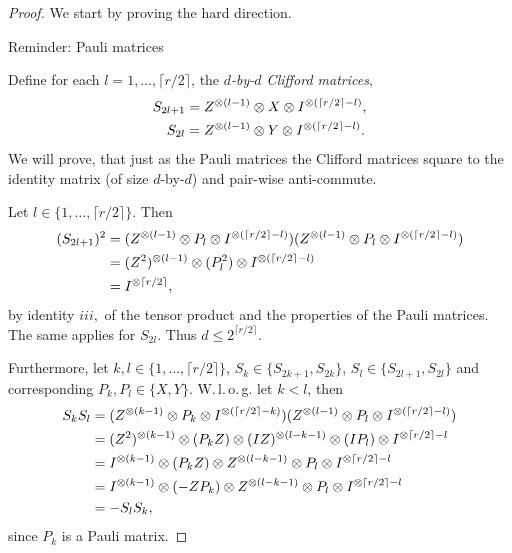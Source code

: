 	\begin{proof}
		We start by proving the hard direction. 
		
		Reminder: Pauli matrices
		
		Define for each $l=1,\dots,\lceil r/2\rceil$, the \emph{$d$-by-$d$ Clifford matrices},
		\begin{align}
			S_{2l+1} &= Z^{\otimes (l-1)} \otimes X \otimes I^{\otimes(\lceil r/2\rceil - l)},\\
			S_{2l} &= Z^{\otimes (l-1)} \otimes Y \otimes I^{\otimes(\lceil r/2\rceil - l)}.
		\end{align}
		We will prove, that just as the Pauli matrices the Clifford matrices square to the identity matrix (of size $d$-by-$d$) and pair-wise anti-commute. 
	
		Let $l\in\{1,\dots,\lceil r/2\rceil\}$. Then
		\begin{align*}
			(S_{2l+1})^2 &= (Z^{\otimes (l-1)} \otimes P_l \otimes I^{\otimes(\lceil r/2\rceil - l)}) (Z^{\otimes (l-1)} \otimes P_l \otimes I^{\otimes(\lceil r/2\rceil - l)}) \\
			&= (Z^2)^{\otimes (l-1)} \otimes (P_l^2) \otimes I^{\otimes (\lceil r/2 \rceil -l)} \\
			&= I^{\otimes \lceil r/2 \rceil},
		\end{align*}
		by identity $iii,$ of the tensor product and the properties of the Pauli matrices. The same applies for $S_{2l}$. Thus $d\leq 2^{\lceil r/2 \rceil}$.
		
		Furthermore, let $k,l\in\{1,\dots, \lceil r/2 \rceil\}$, $S_k\in\{S_{2k+1},S_{2k}\}$, $S_l\in\{S_{2l+1},S_{2l}\}$ and corresponding $P_k,P_l\in\{X,Y\}$. W.\,l.\,o.\,g. let $k<l$, then
		\begin{align*}
			S_{k}S_{l} &= (Z^{\otimes (k-1)} \otimes P_k \otimes I^{\otimes(\lceil r/2\rceil - k)})(Z^{\otimes (l-1)} \otimes P_l \otimes I^{\otimes(\lceil r/2\rceil - l)})\\
			&=(Z^2)^{\otimes (k-1)} \otimes (P_k Z) \otimes (I Z)^{\otimes (l-k-1)} \otimes (I P_l) \otimes I^{\otimes \lceil r/2\rceil -l} \\
			&= I^{\otimes (k-1)} \otimes (P_k Z) \otimes Z^{\otimes (l-k-1)} \otimes P_l \otimes I^{\otimes \lceil r/2\rceil -l}\\
			&= I^{\otimes (k-1)} \otimes (- Z P_k) \otimes Z^{\otimes (l-k-1)} \otimes P_l \otimes I^{\otimes \lceil r/2\rceil -l} \\
			&= - S_lS_k,
		\end{align*}
		since $P_k$ is a Pauli matrix.
		

\end{proof}
